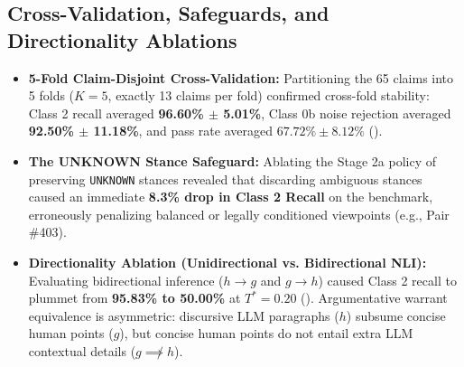 \documentclass[11pt,a4paper]{article}
\begin{document}
\subsection{Cross-Validation, Safeguards, and Directionality Ablations}
\begin{itemize}[leftmargin=*,itemsep=2pt]
    \item \textbf{5-Fold Claim-Disjoint Cross-Validation:} Partitioning the 65 claims into 5 folds ($K = 5$, exactly 13 claims per fold) confirmed cross-fold stability: Class 2 recall averaged \textbf{96.60\% $\pm$ 5.01\%}, Class 0b noise rejection averaged \textbf{92.50\% $\pm$ 11.18\%}, and pass rate averaged $67.72\% \pm 8.12\%$ ().
    \item \textbf{The UNKNOWN Stance Safeguard:} Ablating the Stage 2a policy of preserving \texttt{UNKNOWN} stances revealed that discarding ambiguous stances caused an immediate \textbf{8.3\% drop in Class 2 Recall} on the benchmark, erroneously penalizing balanced or legally conditioned viewpoints (e.g., Pair \#403).
    \item \textbf{Directionality Ablation (Unidirectional vs. Bidirectional NLI):} Evaluating bidirectional inference ($h \to g$ and $g \to h$) caused Class 2 recall to plummet from \textbf{95.83\% to 50.00\%} at $T^* = 0.20$ (). Argumentative warrant equivalence is asymmetric: discursive LLM paragraphs ($h$) subsume concise human points ($g$), but concise human points do not entail extra LLM contextual details ($g \not\implies h$).
\end{itemize}
\end{document}
